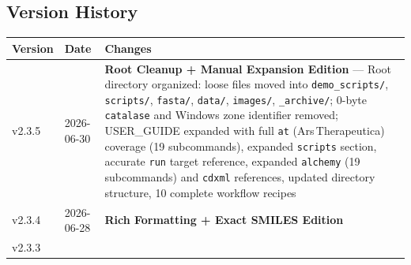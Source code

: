 \hypertarget{version-history}{%
\subsection{Version History}\label{version-history}}

\begin{longtable}[]{@{}lll@{}}
\toprule
\begin{minipage}[b]{0.34\columnwidth}\raggedright
Version\strut
\end{minipage} & \begin{minipage}[b]{0.23\columnwidth}\raggedright
Date\strut
\end{minipage} & \begin{minipage}[b]{0.34\columnwidth}\raggedright
Changes\strut
\end{minipage}\tabularnewline
\midrule
\endhead
\begin{minipage}[t]{0.34\columnwidth}\raggedright
v2.3.5\strut
\end{minipage} & \begin{minipage}[t]{0.23\columnwidth}\raggedright
2026-06-30\strut
\end{minipage} & \begin{minipage}[t]{0.34\columnwidth}\raggedright
\textbf{Root Cleanup + Manual Expansion Edition} --- Root directory
organized: loose files moved into \texttt{demo\_scripts/},
\texttt{scripts/}, \texttt{fasta/}, \texttt{data/}, \texttt{images/},
\texttt{\_archive/}; 0-byte \texttt{catalase} and Windows zone
identifier removed; USER\_GUIDE expanded with full \texttt{at}
(Ars\,Therapeutica) coverage (19 subcommands), expanded \texttt{scripts}
section, accurate \texttt{run} target reference, expanded
\texttt{alchemy} (19 subcommands) and \texttt{cdxml} references, updated
directory structure, 10 complete workflow recipes\strut
\end{minipage}\tabularnewline
\begin{minipage}[t]{0.34\columnwidth}\raggedright
v2.3.4\strut
\end{minipage} & \begin{minipage}[t]{0.23\columnwidth}\raggedright
2026-06-28\strut
\end{minipage} & \begin{minipage}[t]{0.34\columnwidth}\raggedright
\textbf{Rich Formatting + Exact SMILES Edition}\strut
\end{minipage}\tabularnewline
\begin{minipage}[t]{0.34\columnwidth}\raggedright
v2.3.3\strut
\end{minipage} & \begin{minipage}[t]{0.23\columnwidth}\raggedright

\end{minipage}
\end{longtable}
